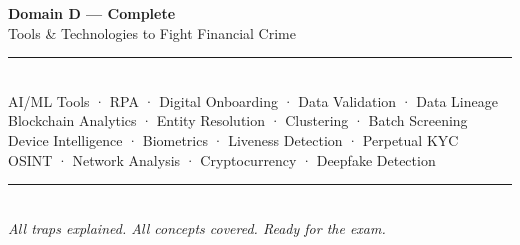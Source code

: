 \documentclass[12pt,aspectratio=169]{beamer}
\begin{document}
	\begin{frame}
		\centering
		\vspace{1.5cm}
		{\fontsize{18}{22}\selectfont \textbf{Domain D — Complete}}\\[0.2cm]
		{\fontsize{11}{13}\selectfont Tools \& Technologies to Fight Financial Crime}\\[0.1cm]
		\rule{4cm}{0.5pt}\\[0.1cm]
		{\fontsize{8}{10}\selectfont AI/ML Tools · RPA · Digital Onboarding · Data Validation · Data Lineage}\\[0.05cm]
		{\fontsize{8}{10}\selectfont Blockchain Analytics · Entity Resolution · Clustering · Batch Screening}\\[0.05cm]
		{\fontsize{8}{10}\selectfont Device Intelligence · Biometrics · Liveness Detection · Perpetual KYC}\\[0.05cm]
		{\fontsize{8}{10}\selectfont OSINT · Network Analysis · Cryptocurrency · Deepfake Detection}\\[0.1cm]
		\rule{4cm}{0.5pt}\\[0.1cm]
		{\fontsize{8}{10}\selectfont \textit{All traps explained. All concepts covered. Ready for the exam.}}
		\vspace{0.5cm}
	\end{frame}
	
\end{document}
